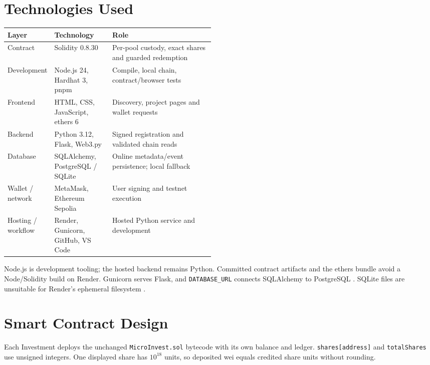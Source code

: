 \documentclass[10pt,a4paper]{article}
\begin{document}
\clearpage
\section{Technologies Used}
\begin{center}\small
{}\label{tab:technology}
\begin{tabularx}{\linewidth}{@{}p{0.19\linewidth}p{0.29\linewidth}X@{}}
\toprule\textbf{Layer} & \textbf{Technology} & \textbf{Role} \\
\midrule
Contract & Solidity 0.8.30 & Per-pool custody, exact shares and guarded redemption \\
Development & Node.js 24, Hardhat 3, pnpm & Compile, local chain, contract/browser tests \\
Frontend & HTML, CSS, JavaScript, ethers 6 & Discovery, project pages and wallet requests \\
Backend & Python 3.12, Flask, Web3.py & Signed registration and validated chain reads \\
Database & SQLAlchemy, PostgreSQL / SQLite & Online metadata/event persistence; local fallback \\
Wallet / network & MetaMask, Ethereum Sepolia & User signing and testnet execution \\
Hosting / workflow & Render, Gunicorn, GitHub, VS Code & Hosted Python service and development \\
\bottomrule
\end{tabularx}
\end{center}
Node.js is development tooling; the hosted backend remains Python. Committed contract artifacts and the ethers bundle avoid a Node/Solidity build on Render. Gunicorn serves Flask, and \texttt{DATABASE\_URL} connects SQLAlchemy to PostgreSQL \cite{sqlalchemy}. SQLite files are unsuitable for Render's ephemeral filesystem \cite{render}.

\section{Smart Contract Design}
Each Investment deploys the unchanged \texttt{MicroInvest.sol} bytecode with its own balance and ledger. \texttt{shares[address]} and \texttt{totalShares} use unsigned integers. One displayed share has $10^{18}$ units, so deposited wei equals credited share units without rounding.
\end{document}
